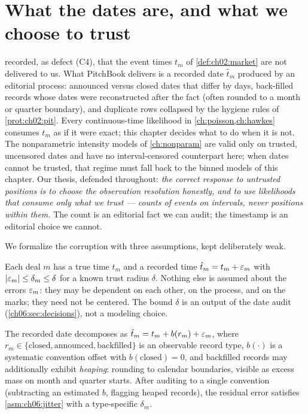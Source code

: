 
\section{What the dates are, and what we choose to trust}\label{ch06:sec:defect}

 recorded, as defect (C4), that the event times $t_m$ of
\cref{def:ch02:market} are not delivered to us. What PitchBook delivers is a
recorded date $\hat t_m$ produced by an editorial process: announced versus
closed dates that differ by days, back-filled records whose dates were
reconstructed after the fact (often rounded to a month or quarter boundary),
and duplicate rows collapsed by the hygiene rules of
\cref{prot:ch02:pit}. Every continuous-time likelihood in
\cref{ch:poisson,ch:hawkes} consumes $t_m$ as if it were exact; this chapter
decides what to do when it is not. The nonparametric intensity models of
\cref{ch:nonparam} are valid only on trusted, uncensored dates and have no
interval-censored counterpart here; when dates cannot be trusted, that
regime must fall back to the binned models of this chapter. Our thesis,
defended throughout: \emph{the correct response to untrusted positions is to choose
the observation resolution honestly, and to use likelihoods that consume
only what we trust --- counts of events on intervals, never positions within
them.} The count is an editorial fact we can audit; the timestamp is an
editorial choice we cannot.

We formalize the corruption with three assumptions, kept deliberately weak.

\begin{assumption}\label{asm:ch06:jitter}
Each deal $m$ has a true time $t_m$ and a recorded time
$\hat t_m = t_m + \varepsilon_m$ with $\left|\varepsilon_m\right| \le \delta_m \le \delta$ for a
known trust radius $\delta$. Nothing else is assumed about the errors
$\varepsilon_m$: they may be dependent on each other, on the process, and on the
marks; they need not be centered. The bound $\delta$ is an output of the
date audit (\cref{ch06:sec:decisions}), not a modeling choice.
\end{assumption}

\begin{assumption}\label{asm:ch06:convention}
The recorded date decomposes as
$\hat t_m = t_m + b(r_m) + \varepsilon_m$, where $r_m \in
\{\text{closed},\allowbreak \text{announced},\allowbreak
\text{backfilled}\}$ is an observable record type, $b(\cdot)$ is a
systematic convention offset with $b(\text{closed}) = 0$, and backfilled
records may additionally exhibit \emph{heaping}: rounding to calendar
boundaries, visible as excess mass on month and quarter starts. After
auditing to a single convention (subtracting an estimated $b$, flagging
heaped records), the residual error satisfies \cref{asm:ch06:jitter} with a
type-specific $\delta_m$.
\end{assumption}

